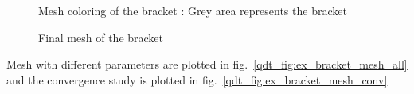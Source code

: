 \begin{figure}
    \centering
    \caption[Mesh coloring of the bracket]{Mesh coloring of the bracket : Grey area represents the bracket}
    \label{qdt_fig:ex_chole_mesh_coloring}
\end{figure}

\begin{figure}
    \centering
    \caption[Final mesh of the bracket]{Final mesh of the bracket}
    \label{qdt_fig:ex_chole_mesh_final}
\end{figure}
Mesh with different parameters are plotted in fig.~\ref{qdt_fig:ex_bracket_mesh_all} and the convergence study is plotted in fig.~\ref{qdt_fig:ex_bracket_mesh_conv}

